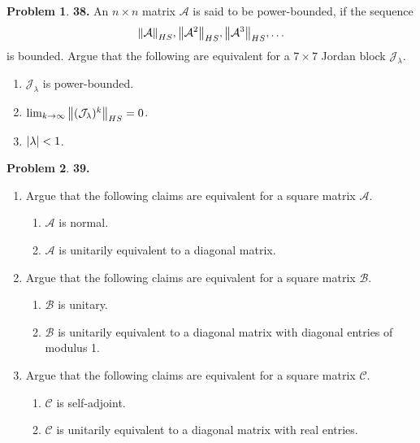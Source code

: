 \documentclass{book}
\theoremstyle{definition}
\newtheorem*{prob*}{Problem}
\newcommand{\A}{\mathcal{A}}
\newcommand{\B}{\mathcal{B}}
\newcommand{\jor}{\mathcal{J}}
\begin{document}
\newpage




\begin{prob*}\textbf{38.} An $n\times n$ matrix $\A$ is said to be power-bounded, if the sequence
	\begin{align*}
	\norm{\A}_{HS}, \norm{\A^2}_{HS}, \norm{\A^3}_{HS}, \dots
	\end{align*}
	is bounded. Argue that the following are equivalent for a $7\times 7$ Jordan block $\jor_\lambda$.
	\begin{enumerate}
		\item $\jor_\lambda$ is power-bounded. 
		\item $\lim_{k\to\infty} \norm{(\jor_\lambda)^k}_{HS}= 0$.
		\item $\abs{\lambda} < 1$.
	\end{enumerate}
	
\end{prob*}





\newpage



\begin{prob*}\textbf{39.} 
	\begin{enumerate}
		\item Argue that the following claims are equivalent for a square matrix $\A$.
		
		\begin{enumerate}
			\item $\A$ is normal.
			\item $\A$ is unitarily equivalent to a diagonal matrix.
		\end{enumerate}
		
		
		
		\item Argue that the following claims are equivalent for a square matrix $\B$.
		
		\begin{enumerate}
			\item $\B$ is unitary.
			\item $\B$ is unitarily equivalent to a diagonal matrix with diagonal entries of modulus 1. 
		\end{enumerate}
		
		
		\item Argue that the following claims are equivalent for a square matrix $\mathcal{C}$.
		
		\begin{enumerate}
			\item $\mathcal{C}$ is self-adjoint.
			\item $\mathcal{C}$ is unitarily equivalent to a diagonal matrix with real entries.
		\end{enumerate}
	\end{enumerate}
	
\end{prob*}
\end{document}
